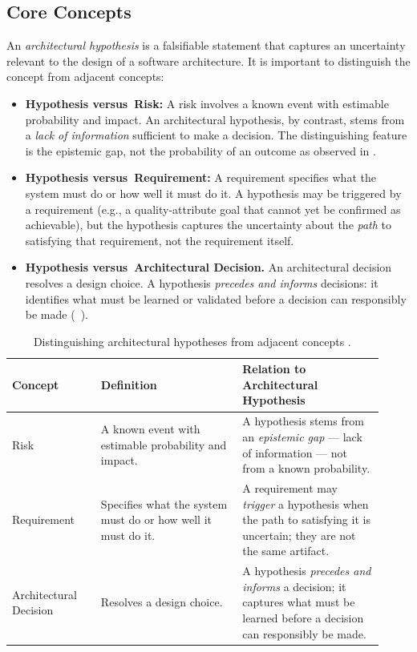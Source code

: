 \subsection{Core Concepts}
\label{subsec:archhypo-core}

An \emph{architectural hypothesis} is a falsifiable statement that captures an uncertainty relevant to the design of a software architecture. 
It is important to distinguish the concept from adjacent concepts:

\begin{itemize}
  \item \textbf{Hypothesis versus\ Risk:} A risk involves a known event with estimable
  probability and impact. An architectural hypothesis, by contrast, stems from a \emph{lack of information} sufficient to make a decision. 
  The distinguishing feature is the epistemic gap, not the probability of an outcome as observed in \citet{silva2024tse}.

  \item \textbf{Hypothesis versus\ Requirement:} A requirement specifies what the system
  must do or how well it must do it. A hypothesis may be triggered by a requirement
  (e.g., a quality-attribute goal that cannot yet be confirmed as achievable), but the
  hypothesis captures the uncertainty about the \emph{path} to satisfying that
  requirement, not the requirement itself.

  \item \textbf{Hypothesis versus\ Architectural Decision.} An architectural decision
  resolves a design choice. A hypothesis \emph{precedes and informs} decisions: it
  identifies what must be learned or validated before a decision can responsibly be
  made (~\citep{silva2024tse}).
\end{itemize}

\begin{table}[htbp]
\centering
\caption{Distinguishing architectural hypotheses from adjacent concepts \citep{silva2024tse}.}
\label{tab:hypothesis-concepts}
\begin{tabular}{p{0.22\linewidth} p{0.35\linewidth} p{0.35\linewidth}}
\toprule
\textbf{Concept} & \textbf{Definition} & \textbf{Relation to Architectural Hypothesis} \\
\midrule
Risk & A known event with estimable probability and impact. & A hypothesis stems from an \emph{epistemic gap} --- lack of information --- not from a known probability. \\
\midrule
Requirement & Specifies what the system must do or how well it must do it. & A requirement may \emph{trigger} a hypothesis when the path to satisfying it is uncertain; they are not the same artifact. \\
\midrule
Architectural Decision & Resolves a design choice. & A hypothesis \emph{precedes and informs} a decision; it captures what must be learned before a decision can responsibly be made. \\
\bottomrule
\end{tabular}
\end{table}

